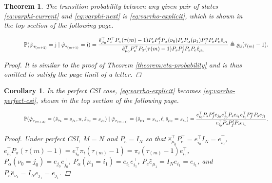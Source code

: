 \documentclass[letterpaper, 10 pt, conference]{ieeeconf}  %
\newtheorem{theorem}{Theorem}
\newtheorem{corollary}{Corollary}[theorem]
\begin{document}
\begin{theorem}\label{theorem:varphi-probability}
    The transition probability between any given pair of states \eqref{eq:varphi-current} and \eqref{eq:varphi-next} is \eqref{eq:varrho-explicit}, which is shown in the top section of the following page.

\begin{figure}[ht]
\raggedright
\begin{equation}\label{eq:varrho-explicit}
\text{\small $\mathbb{P}(
\hat{\varphi}_{\tau_{(m+2)}}^{} = \mathrm{j} \mid \hat{\varphi}_{\tau_{(m+1)}}^{} = \mathrm{i}) = 
\frac{\hat{e}_{\mu_0}^{\top} P_{e}^{\top} P_{\pi}(\tau{(m)}-1) P_{s} P_{f}^{\ell} P_{\alpha}(\nu_0) P_{s} P_{\alpha}(\mu_1) P_{f}^{n} P_{s} P_{e}\hat{e}_{\nu_1}}{\hat{e}_{\mu_0}^{\top} P_{e}^{\top} P_{\pi}(\tau{(m)}-1) P_{s} P_{f}^{\ell} P_{s} P_{e}\hat{e}_{\mu_1}} 
\triangleq 
\varrho_{\mathrm{i}\mathrm{j}}(\tau_{(m)}-1).$}
\end{equation}
\end{figure}

\begin{proof}
    It is similar to the proof of Theorem \ref{theorem:eta-probability} and is thus omitted to satisfy the page limit of a letter.
\end{proof}
\end{theorem}
\begin{corollary}\label{corollary:varrho}
In the \emph{perfect CSI} case, \eqref{eq:varrho-explicit} becomes \eqref{eq:varrho-perfect-csi}, shown in the top section of the following page.

\begin{figure}[ht]
\raggedright
\begin{align}\label{eq:varrho-perfect-csi}
    \begin{aligned}
    \vspace*{-2mm}
    \text{\small $\mathbb{P}(
    \hat{\varphi}_{\tau_{(m+2)}}^{} = (\hat{s}_{\nu_{1}} = s_{j_1},n,\hat{s}_{\nu_{0}} = s_{j_0}) \mid 
    \hat{\varphi}_{\tau_{(m+1)}}^{} = (\hat{s}_{\mu_{1}} = s_{i_1},\ell,\hat{s}_{\mu_{0}}= s_{i_1}) = \frac{e_{i_0}^{\top} P_{s} P_{f}^{\ell} e_{j_0}e_{j_0}^{\top} P_{s} e_{i_1}e_{i_1}^{\top} P_{f}^{n}P_{s} e_{j_1}}{e_{i_0}^{\top} P_{s}P_{f}^{\ell}P_{s}e_{i_1}}$}.
    \end{aligned}
\end{align}
\end{figure}
\begin{proof}
    Under perfect CSI, $M=N$ and $P_e = I_{N}$ so that $\hat{e}_{\mu_0}^{\top} P_{e}^{\top} = e_{i_0}^{\top} I_{N} = e_{i_0}^{\top}$, $e_{i_0}^{\top} P_{\pi}(\tau{(m)}-1)=e_{i_0}^{\top}\pi_{i}(\tau_{(m)}-1)=\pi_{i}(\tau_{(m)}-1)e_{i_0}^{\top}$, $P_{\alpha}(\nu_0=j_0)=e_{j_0}e_{j_0}^{\top}$, $P_{\alpha}(\mu_1=i_1)=e_{i_1}e_{i_1}^{\top}$, $P_{e}\hat{e}_{\mu_1} = I_{N} e_{i_1}  = e_{i_1}$, and $P_{e}\hat{e}_{\nu_1} = I_{N} e_{j_1}  = e_{j_1}$.
\end{proof}
\end{corollary}
\end{document}
